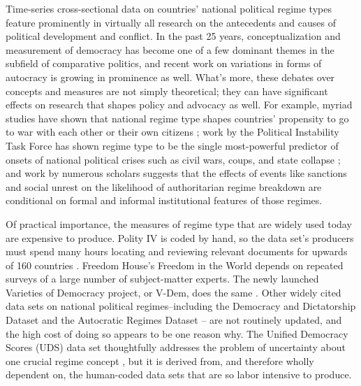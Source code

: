 \documentclass[pdftex,12pt,fullpage,oneside]{amsart}
\begin{document}
Time-series cross-sectional data on countries' national political regime types feature prominently in virtually all research on the antecedents and causes of political development and conflict. In the past 25 years, conceptualization and measurement of democracy has become one of a few dominant themes in the subfield of comparative politics, and recent work on variations in forms of autocracy is growing in prominence as well. What's more, these debates over concepts and measures are not simply theoretical; they can have significant effects on research that shapes policy and advocacy as well. For example, myriad studies have shown that national regime type shapes countries' propensity to go to war with each other or their own citizens \cite{hegre:2014}; work by the Political Instability Task Force has shown regime type to be the single most-powerful predictor of onsets of national political crises such as civil wars, coups, and state collapse \cite{goldstone2010global}; and work by numerous scholars suggests that the effects of events like sanctions \cite{geddes:2002,escriba-foch:wright:2010} and social unrest \cite{ulfelder:2005} on the likelihood of authoritarian regime breakdown are conditional on formal and informal institutional features of those regimes.

Of practical importance, the measures of regime type that are widely used today are expensive to produce. Polity IV is coded by hand, so the data set's producers must spend many hours locating and reviewing relevant documents for upwards of 160 countries \citep{marshall:jaggers:2002}. Freedom House's Freedom in the World depends on repeated surveys of a large number of subject-matter experts. The newly launched Varieties of Democracy project, or V-Dem, does the same \citep{coppedge:etal:2013}. Other widely cited data sets on national political regimes--including the Democracy and Dictatorship Dataset \citep{cheibub:etal:2010} and the Autocratic Regimes Dataset \citep{geddes:etal:2014} -- are not routinely updated, and the high cost of doing so appears to be one reason why. The Unified Democracy Scores (UDS) data set thoughtfully addresses the problem of uncertainty about one crucial regime concept \citep{pemstein:etal:2010}, but it is derived from, and therefore wholly dependent on, the human-coded data sets that are so labor intensive to produce.
\end{document}
